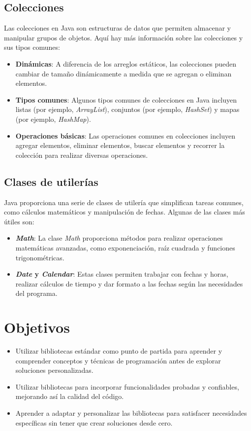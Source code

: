 \documentclass[11pt, twocolumn]{article}
\begin{document}
  \subsection*{Colecciones}
  Las colecciones en Java son estructuras de datos que permiten almacenar y manipular grupos de objetos. Aquí hay más información sobre las colecciones y sus tipos comunes: 
  
  \begin{itemize}
    \item \textbf{Dinámicas}: A diferencia de los arreglos estáticos, las colecciones pueden cambiar de tamaño dinámicamente a medida que se agregan o eliminan elementos.
    \item \textbf{Tipos comunes}: Algunos tipos comunes de colecciones en Java incluyen listas (por ejemplo, \textit{ArrayList}), conjuntos (por ejemplo, \textit{HashSet}) y mapas (por ejemplo, \textit{HashMap}).
    \item \textbf{Operaciones básicas}: Las operaciones comunes en colecciones incluyen agregar elementos, eliminar elementos, buscar elementos y recorrer la colección para realizar diversas operaciones.
  \end{itemize}

  \subsection*{Clases de utilerías}
  Java proporciona una serie de clases de utilería que simplifican tareas comunes, como cálculos matemáticos y manipulación de fechas. Algunas de las clases más útiles son:

  \begin{itemize}
    \item \textbf{\textit{Math}}: La clase \textit{Math} proporciona métodos para realizar operaciones matemáticas avanzadas, como exponenciación, raíz cuadrada y funciones trigonométricas.
    \item \textbf{\textit{Date} y \textit{Calendar}}: Estas clases permiten trabajar con fechas y horas, realizar cálculos de tiempo y dar formato a las fechas según las necesidades del programa.
  \end{itemize}

  \section*{Objetivos}
  \begin{itemize}
    \item Utilizar bibliotecas estándar como punto de partida para aprender y comprender conceptos y técnicas de programación antes de explorar soluciones personalizadas.
    \item Utilizar bibliotecas para incorporar funcionalidades probadas y confiables, mejorando así la calidad del código.
    \item Aprender a adaptar y personalizar las bibliotecas para satisfacer necesidades específicas sin tener que crear soluciones desde cero.
  \end{itemize}
\end{document}
